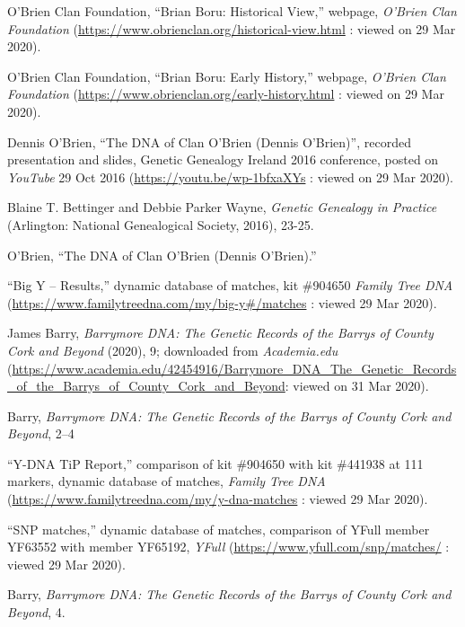 \begin{thebibliography}{999}
	\raggedright
	\small


O'Brien Clan Foundation, ``Brian Boru: Historical View,'' webpage, \textit{O'Brien Clan Foundation} (\url{https://www.obrienclan.org/historical-view.html} : viewed on 29 Mar 2020).

O'Brien Clan Foundation, ``Brian Boru: Early History,'' webpage, \textit{O'Brien Clan Foundation} (\url{https://www.obrienclan.org/early-history.html} : viewed on 29 Mar 2020).

Dennis O'Brien, ``The DNA of Clan O'Brien (Dennis O'Brien)'', recorded presentation and slides, Genetic Genealogy Ireland 2016 conference, posted on \textit{YouTube} 29 Oct 2016 (\url{https://youtu.be/wp-1bfxaXYs} : viewed on 29 Mar 2020).	

Blaine T. Bettinger and Debbie Parker Wayne, \textit{Genetic Genealogy in Practice} (Arlington: National Genealogical Society, 2016), 23-25.

O'Brien, ``The DNA of Clan O'Brien (Dennis O'Brien).''

``Big Y -- Results,'' dynamic database of matches, kit \#904650 \textit{Family Tree DNA} (\url{https://www.familytreedna.com/my/big-y\#/matches} : viewed 29 Mar 2020).

James Barry, \textit{Barrymore DNA: The Genetic Records of the Barrys of County Cork and Beyond} (2020), 9; downloaded from \textit{Academia.edu} (\url{https://www.academia.edu/42454916/Barrymore_DNA_The_Genetic_Records_of_the_Barrys_of_County_Cork_and_Beyond}: viewed on 31 Mar 2020).

Barry, \textit{Barrymore DNA: The Genetic Records of the Barrys of County Cork and Beyond}, 2--4

``Y-DNA TiP Report,'' comparison of kit \#904650 with kit \#441938 at 111 markers, dynamic database of matches, \textit{Family Tree DNA} (\url{https://www.familytreedna.com/my/y-dna-matches} : viewed 29 Mar 2020).

``SNP matches,'' dynamic database of matches, comparison of YFull member YF63552 with member YF65192, \textit{YFull} (\url{https://www.yfull.com/snp/matches/} : viewed 29 Mar 2020).

Barry, \textit{Barrymore DNA: The Genetic Records of the Barrys of County Cork and Beyond}, 4.

\end{thebibliography}